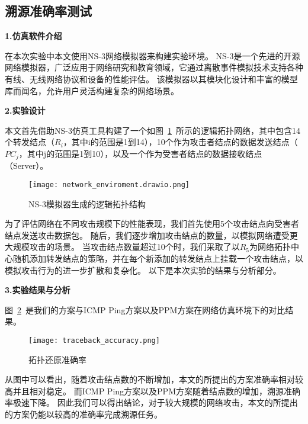 \subsection{溯源准确率测试}
\textbf{1.仿真软件介绍}\par
在本次实验中本文使用NS-3网络模拟器来构建实验环境。
NS-3是一个先进的开源网络模拟器，广泛应用于网络研究和教育领域，它通过离散事件模拟技术支持各种有线、无线网络协议和设备的性能评估。
该模拟器以其模块化设计和丰富的模型库而闻名，允许用户灵活构建复杂的网络场景。\par
\textbf{2.实验设计}\par
本文首先借助NS-3仿真工具构建了一个如图~\ref{fig:network_enviroment}~所示的逻辑拓扑网络，其中包含14个转发结点（$R_i$，其中i的范围是1到14），10个作为攻击者结点的数据发送结点（$PC_j$，其中j的范围是1到10），以及一个作为受害者结点的数据接收结点（Server）。
\begin{figure}[h]
  \centering
  \texttt{[image: network\_enviroment.drawio.png]}
  \caption{NS-3模拟器生成的逻辑拓扑结构}
  \label{fig:network_enviroment}
\end{figure}
为了评估网络在不同攻击规模下的性能表现，我们首先使用5个攻击结点向受害者结点发送攻击数据包。
随后，我们逐步增加攻击结点的数量，以模拟网络遭受更大规模攻击的场景。
当攻击结点数量超过10个时，我们采取了以$R_5$为网络拓扑中心随机添加转发结点的策略，并在每个新添加的转发结点上挂载一个攻击结点，以模拟攻击行为的进一步扩散和复杂化。
以下是本次实验的结果与分析部分。\par
\textbf{3.实验结果与分析}\par
图~\ref{fig:traceback_accuracy}~是我们的方案与ICMP Ping方案以及PPM方案在网络仿真环境下的对比结果。
\begin{figure}[h]
  \centering
  \texttt{[image: traceback\_accuracy.png]}
  \caption{拓扑还原准确率}
  \label{fig:traceback_accuracy}
\end{figure}

从图中可以看出，随着攻击结点数的不断增加，本文的所提出的方案准确率相对较高并且相对稳定。
而ICMP Ping方案以及PPM方案随着结点数的增加，溯源准确率极速下降。
因此我们可以得出结论，对于较大规模的网络攻击，本文的所提出的方案仍能以较高的准确率完成溯源任务。
